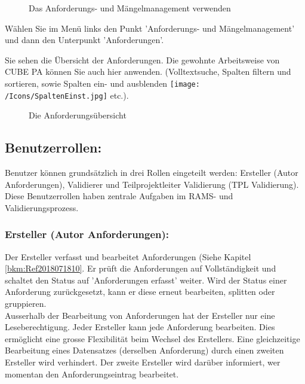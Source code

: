 \begin{figure}
\begin{center}
  \end{center}
  \vspace{-20pt}
  \caption{Das Anforderungs- und Mängelmanagement verwenden}
  \vspace{-10pt}
\end{figure}

Wählen Sie im Menü links den Punkt 'Anforderungs- und Mängelmanagement' und dann den Unterpunkt 'Anforderungen'.

\vspace{10.5cm}

Sie sehen die Übersicht der Anforderungen. Die gewohnte Arbeitsweise von CUBE PA können Sie auch hier anwenden. (Volltextsuche, Spalten filtern und sortieren, sowie Spalten ein- und ausblenden \texttt{[image: /Icons/SpaltenEinst.jpg]} etc.).

\begin{figure}[H]
\caption{Die Anforderungsübersicht}
\end{figure}

\subsection{Benutzerrollen:} 
Benutzer können grundsätzlich in drei Rollen eingeteilt werden: Ersteller (Autor Anforderungen), Validierer und Teilprojektleiter Validierung (TPL Validierung). Diese Benutzerrollen haben zentrale Aufgaben im RAMS- und Validierungsprozess.

\subsubsection{Ersteller (Autor Anforderungen):} 
Der Ersteller verfasst und bearbeitet Anforderungen (Siehe Kapitel \ref{bkm:Ref2018071810}. Er prüft die Anforderungen auf Vollständigkeit und schaltet den Status auf 'Anforderungen erfasst' weiter. Wird der Status einer Anforderung zurückgesetzt, kann er diese erneut bearbeiten, splitten oder gruppieren. \\
Ausserhalb der Bearbeitung von Anforderungen hat der Ersteller nur eine Leseberechtigung. Jeder Ersteller kann jede Anforderung bearbeiten. Dies ermöglicht eine grosse Flexibilität beim Wechsel des Erstellers. Eine gleichzeitige Bearbeitung eines Datensatzes (derselben Anforderung) durch einen zweiten Ersteller wird verhindert. Der zweite Ersteller wird darüber informiert, wer momentan den Anforderungseintrag bearbeitet. 

